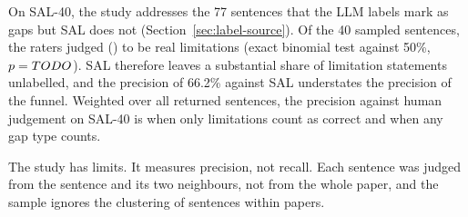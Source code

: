 On SAL-40, the study addresses the 77 sentences that the LLM labels mark as gaps but SAL does not (Section~\ref{sec:label-source}). Of the 40 sampled sentences, the raters judged \hsSTwoYes{} (\hsSTwoShare) to be real limitations (exact binomial test against 50\%, $p = TODO$).
SAL therefore leaves a substantial share of limitation statements unlabelled, and the precision of 66.2\% against SAL understates the precision of the funnel.
Weighted over all returned sentences, the precision against human judgement on SAL-40 is \hsSalLim{} when only limitations count as correct and \hsSalAny{} when any gap type counts.

The study has limits. It measures precision, not recall. Each sentence was judged from the sentence and its two neighbours, not from the whole paper, and the sample ignores the clustering of sentences within papers.
